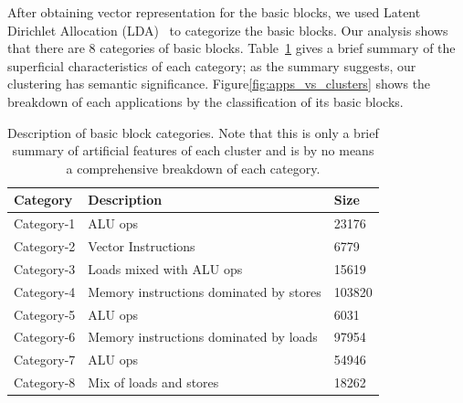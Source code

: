 After obtaining vector representation for the basic blocks, 
we used Latent Dirichlet Allocation (LDA)~\cite{lda} to categorize the basic blocks.
Our analysis shows that there are 8 categories of basic blocks.
Table~\ref{tab:categories} gives a brief summary of the superficial characteristics
of each category; as the summary suggests, our clustering has semantic significance.
Figure\ref{fig:apps_vs_clusters} shows the breakdown of each applications
by the classification of its basic blocks.
\begin{table}
\begin{tabular}{|p{}|p{}|p{}|}
    \hline
    Category & Description & Size \\
    \hline
    
    Category-1 & 
    ALU ops & 23176 \\
    \hline
    
    Category-2 &
    Vector Instructions & 6779 \\
    \hline
    
    Category-3 &
    Loads mixed with ALU ops & 15619 \\
    \hline
    
    Category-4 &
    Memory instructions dominated by stores & 103820 \\
    \hline
    
    Category-5 &
    ALU ops & 6031 \\
    \hline
    
    Category-6 &
    Memory instructions dominated by loads & 97954 \\
    \hline
    
    Category-7 &
    ALU ops & 54946 \\
    \hline
    
    Category-8 &
    Mix of loads and stores & 18262 \\
    \hline
\end{tabular}
\\
\caption{Description of basic block categories. Note that this is only a brief
summary of artificial features of each cluster and is by no means a comprehensive
breakdown of each category.}
\label{tab:categories}

\end{table}

